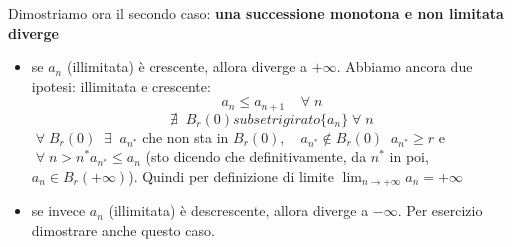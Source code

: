 \newline
Dimostriamo ora il secondo caso:
\newline
\textbf{una successione monotona e non limitata diverge} 
\begin{itemize}
    \item se $a_n$ (illimitata) è crescente, allora diverge a $+ \infty$.
    \newline
    Abbiamo ancora due ipotesi: illimitata e crescente:
    \[
        a_n \leq a_{n+1} \;\;\; \;\forall\; n
    \]
    \[
        \nexists \;\; B_r(0) subsetrigirato \{a_n\} \;\forall\;n
    \]
    $\;\forall\; B_r(0) \;\;\exists\;\; a_{n^*} $ che non sta in $B_r(0)$, $\;\;\; a_{n^*} \notin B_r(0) \;\; a_{n^*} \geq r $ e $\;\forall\; n> n^* a_{n^*} \leq a_n$ (sto dicendo che definitivamente, da $n^*$ in poi, $a_n \in B_r(+\infty)$).
    \newline
    Quindi per definizione di limite $\lim_{n\rightarrow +\infty} a_n = + \infty$
    \item se invece $a_n$ (illimitata) è descrescente, allora diverge a $-\infty$.
    \newline
    Per esercizio dimostrare anche questo caso.
\end{itemize}
